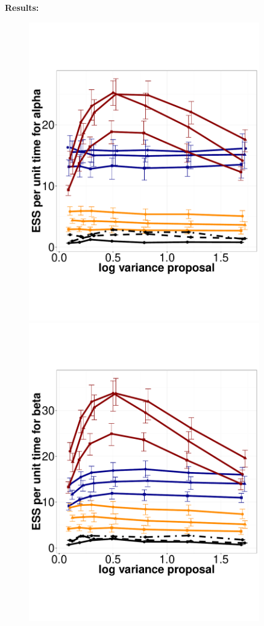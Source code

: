 \noindent \textbf{Results:}
  \begin{figure}%
  \centering
  \begin{minipage}[!hp]{0.45\linewidth}
  \centering
    \includegraphics [width=0.90\textwidth, angle=0]{figs/exp_3_alpha.pdf}
      \end{minipage}
  \begin{minipage}[hp]{0.45\linewidth}
  \centering
    \includegraphics [width=0.90\textwidth, angle=0]{figs/exp_3_beta.pdf}

\end{minipage}
\end{figure}
